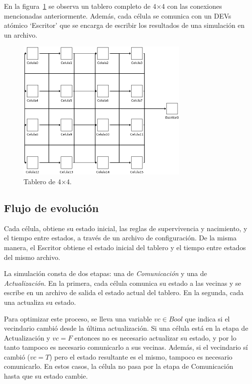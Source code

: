 \documentclass[12pt]{article}
\begin{document}
En la figura~\ref{img:tablero} se observa un tablero completo de 4$\times$4 con las conexiones mencionadas anteriormente. Además, cada célula se comunica con un DEVs atómico `Escritor' que se encarga de escribir los resultados de una simulación en un archivo.

\begin{figure}[ht]
  \centering
  \includegraphics[width=0.75\textwidth]{imagenes/tablero.png}
  \caption{Tablero de 4$\times$4.}\label{img:tablero}
\end{figure}


\subsection{Flujo de evolución}

Cada célula, obtiene su estado inicial, las reglas de supervivencia y nacimiento, y el tiempo entre estados, a través de un archivo de configuración. De la misma manera, el Escritor obtiene el estado inicial del tablero y el tiempo entre estados del mismo archivo.

La simulación consta de dos etapas: una de \textit{Comunicación} y una de \textit{Actualización}. En la primera, cada célula comunica su estado a las vecinas y se escribe en un archivo de salida el estado actual del tablero. En la segunda, cada una actualiza su estado.

Para optimizar este proceso, se lleva una variable $vc \in Bool$ que indica si el vecindario cambió desde la última actualización. Si una célula está en la etapa de Actualización y $vc = F$ entonces no es necesario actualizar su estado, y por lo tanto tampoco es necesario comunicarlo a sus vecinas. Además, si el vecindario sí cambió ($vc = T$) pero el estado resultante es el mismo, tampoco es necesario comunicarlo. En estos casos, la célula no pasa por la etapa de Comunicación hasta que su estado cambie.
\end{document}
